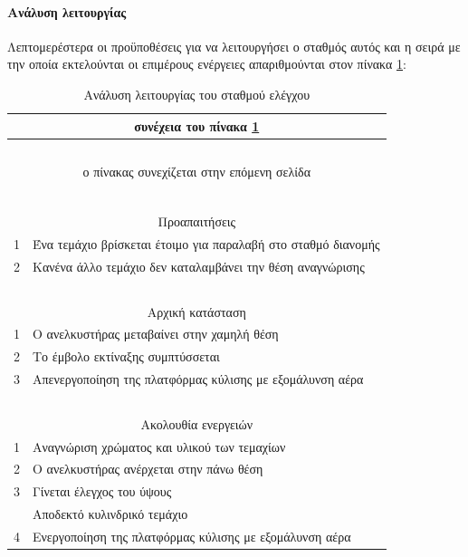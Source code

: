 \documentclass[a4paper,12pt,twoside]{report}
\begin{document}
{				\paragraph{Ανάλυση λειτουργίας} {Λεπτομερέστερα οι προϋποθέσεις για να λειτουργήσει ο σταθμός αυτός και η σειρά με την οποία εκτελούνται οι επιμέρους ενέργειες απαριθμούνται στον πίνακα \ref{πιν.:Ανάλυση λειτουργίας του σταθμού ελέγχου}:
				}
				\begin{longtable} { m{0.5cm} m{12cm} }
					\caption [Ανάλυση λειτουργίας του σταθμού ελέγχου]  {Ανάλυση λειτουργίας του σταθμού ελέγχου \cite{FestoMPSTestingStationManual}}
					\label{πιν.:Ανάλυση λειτουργίας του σταθμού ελέγχου}\\
					\hline
					\endfirsthead
					\multicolumn{2}{c}{συνέχεια του πίνακα \ref{πιν.:Ανάλυση λειτουργίας του σταθμού ελέγχου}}\\
					\hline
					~\\
					\endhead
					\hline
					\multicolumn{2}{c}{ο πίνακας συνεχίζεται στην επόμενη σελίδα}\\
					\endfoot
					\multicolumn{2}{c}{ολοκληρώθηκε ο πίνακας \ref{πιν.:Ανάλυση λειτουργίας του σταθμού ελέγχου}}\\
					\endlastfoot
					~\\
					\multicolumn{2}{c}{Προαπαιτήσεις}\\
					1 & Ένα τεμάχιο βρίσκεται έτοιμο για παραλαβή στο σταθμό διανομής\\
					2 & Κανένα άλλο τεμάχιο δεν καταλαμβάνει την θέση αναγνώρισης\\
					\hline
					~\\
					\multicolumn{2}{c}{Αρχική κατάσταση}\\
					1 & Ο ανελκυστήρας μεταβαίνει στην χαμηλή θέση\\
					2 & Το έμβολο εκτίναξης συμπτύσσεται\\
					3 & Απενεργοποίηση της πλατφόρμας κύλισης με εξομάλυνση αέρα\\
					\hline
					~\\
					\multicolumn{2}{c}{Ακολουθία ενεργειών}\\
					1 & Αναγνώριση χρώματος και υλικού των τεμαχίων\\
					2 & Ο ανελκυστήρας ανέρχεται στην πάνω θέση\\
					3 & Γίνεται έλεγχος του ύψους\\
					   & Αποδεκτό κυλινδρικό τεμάχιο\\
					 4 & Ενεργοποίηση της πλατφόρμας κύλισης με εξομάλυνση αέρα\\

\end{longtable}}
\end{document}
